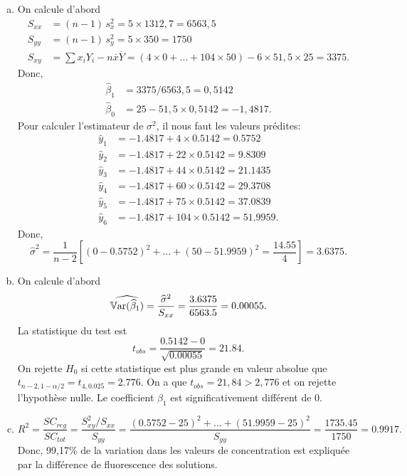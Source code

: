 \documentclass[letter, 11pt]{article}
\begin{document}
\begin{enumerate}[leftmargin=*, wide, label=\bf Exercice \arabic*:]
{\begin{enumerate}[a) ]
\item On calcule d'abord
\begin{align*}
S_{xx} &= (n-1)\,s^2_x = 5\times 1312,7=6563,5 \\
S_{yy} &= (n-1)\,s^2_y = 5\times 350=1750 \\
S_{xy} &= \sum x_iY_i-n\overline x\overline Y=(4\times0 + \ldots + 104\times 50) -6\times 51,5\times 25 = 3375.
\end{align*}
Donc,
\begin{align*}
\widehat{\beta}_1 &= 3375 / 6563,5 = 0,5142 \\
\widehat{\beta}_0 &= 25 - 51,5\times0,5142 = -1,4817.
\end{align*}
Pour calculer l'estimateur de $\sigma^2$, il nous faut les valeurs prédites:
\begin{align*}
\widehat{y}_1 &= -1.4817 + 4 \times 0.5142 = 0.5752 \\
\widehat{y}_2 &= -1.4817 + 22 \times 0.5142 = 9.8309 \\
\widehat{y}_3 &= -1.4817 + 44 \times 0.5142 = 21.1435 \\
\widehat{y}_4 &= -1.4817 + 60 \times 0.5142 = 29.3708 \\
\widehat{y}_5 &= -1.4817 + 75 \times 0.5142 = 37.0839 \\
\widehat{y}_6 &= -1.4817 + 104 \times 0.5142 = 51.9959.
\end{align*}
Donc,
$$ \widehat\sigma^2 = \dfrac{1}{n-2} \left[(0-0.5752)^2 + \ldots +(50-51.9959)^2 = \frac{14.55}{4} \right]= 3.6375. $$


\item On calcule d'abord
 $$ \widehat{\mathbb{V}\text{ar}(\widehat{\beta}_1)}  = \frac{\widehat\sigma^2}{S_{xx}} = \frac{3.6375}{6563.5} = 0.00055.$$
La statistique du test est
$$ t_{obs} = \frac{0.5142 - 0}{\sqrt{0.00055}} =  21.84.$$
On rejette $H_0$ si cette statistique est plus grande en valeur absolue  que $t_{n-2,1-\alpha/2} = t_{4,0.025} = 2.776$. On a que $t_{obs} = 21,84 > 2,776$ et on rejette l'hypothèse nulle. Le coefficient $\beta_1$ est significativement différent de 0.

\item
$$ R^2 = \dfrac{SC_{reg}}{SC_{tot}} = \dfrac{S^2_{xy}/S_{xx}}{S_{yy}}=\frac{(0.5752 -25)^2 + \ldots + (51.9959 - 25)^2}{S_{yy}} = \frac{1735.45}{1750} = 0.9917. $$
Donc, 99,17\% de la variation dans les valeurs de concentration est expliquée par la différence de fluorescence des solutions. 


\end{enumerate}}
\end{enumerate}
\end{document}
